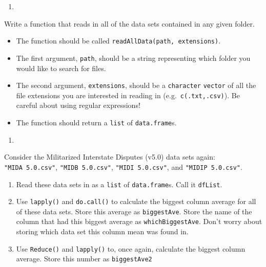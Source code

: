 \documentclass[
  12pt,
  krantz2]{krantz}
\providecommand{\tightlist}{%
  \setlength{\itemsep}{0pt}\setlength{\parskip}{0pt}}
\begin{document}
\begin{enumerate}
\def\labelenumi{\arabic{enumi}.}
\setcounter{enumi}{1}
\tightlist
\item
\end{enumerate}

Write a function that reads in all of the data sets contained in any given folder.

\begin{itemize}
\tightlist
\item
  The function should be called \texttt{readAllData(path,\ extensions)}.
\item
  The first argument, \texttt{path}, should be a string representing which folder you would like to search for files.
\item
  The second argument, \texttt{extensions}, should be a \texttt{character} \texttt{vector} of all the file extensions you are interested in reading in (e.g.~\texttt{c(\textquotesingle{}.txt\textquotesingle{},\textquotesingle{}.csv\textquotesingle{})}). Be careful about using regular expressions!
\item
  The function should return a \texttt{list} of \texttt{data.frame}s.
\end{itemize}

\begin{enumerate}
\def\labelenumi{\arabic{enumi}.}
\setcounter{enumi}{2}
\tightlist
\item
\end{enumerate}

Consider the Militarized Interstate Disputes (v5.0) \citep{mid5} data sets again: \texttt{"MIDA\ 5.0.csv"}, \texttt{"MIDB\ 5.0.csv"}, \texttt{"MIDI\ 5.0.csv"}, and \texttt{"MIDIP\ 5.0.csv"}.

\begin{enumerate}
\def\labelenumi{\alph{enumi})}
\tightlist
\item
  Read these data sets in as a \texttt{list} of \texttt{data.frame}s. Call it \texttt{dfList}.
\item
  Use \texttt{lapply()} and \texttt{do.call()} to calculate the biggest column average for all of these data sets. Store this average as \texttt{biggestAve}. Store the name of the column that had this biggest average as \texttt{whichBiggestAve}. Don't worry about storing which data set this column mean was found in.
\item
  Use \texttt{Reduce()} and \texttt{lapply()} to, once again, calculate the biggest column average. Store this number as \texttt{biggestAve2}
\end{enumerate}

  

\backmatter
\printindex
\end{document}
